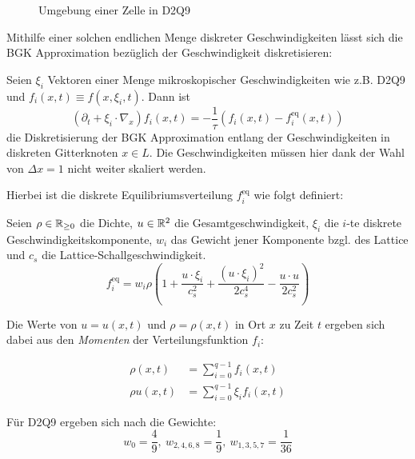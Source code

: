 \begin{figure}
\centering

\caption{Umgebung einer Zelle in D2Q9}
\end{figure}

Mithilfe einer solchen endlichen Menge diskreter Geschwindigkeiten lässt sich die BGK Approximation bezüglich der Geschwindigkeit diskretisieren:

\begin{Definition}
\label{def:disVelBGK}
Seien \(\xi_i\) Vektoren einer Menge mikroskopischer Geschwindigkeiten wie z.B. D2Q9 und \(f_i(x,t) \equiv f(x,\xi_i,t)\). Dann ist
\[ (\partial_t + \xi_i \cdot \nabla_x) f_i(x,t) = -\frac{1}{\tau} (f_i(x,t) - f_i^\text{eq}(x,t)) \]
die Diskretisierung der BGK Approximation entlang der Geschwindigkeiten in diskreten Gitterknoten \(x \in L\). Die Geschwindigkeiten müssen hier dank der Wahl von \(\Delta x = 1\) nicht weiter skaliert werden.
\end{Definition}

Hierbei ist die diskrete Equilibriumsverteilung \(f_i^\text{eq}\) wie folgt definiert:

\begin{Definition}
\label{def:fieq}
Seien \(\rho \in \mathbb{R}_{\geq 0}\) die Dichte, \(u \in \mathbb{R}^2\) die Gesamtgeschwindigkeit, \(\xi_i\) die \(i\)-te diskrete Geschwindigkeitskomponente, \(w_i\) das Gewicht jener Komponente bzgl. des Lattice und \(c_s\) die Lattice-Schallgeschwindigkeit.
\[f_i^\text{eq} = w_i \rho \left( 1 + \frac{u \cdot \xi_i}{c_s^2} + \frac{(u \cdot \xi_i)^2}{2c_s^4} - \frac{u \cdot u}{2c_s^2} \right)\]
\end{Definition}

Die Werte von \(u = u(x,t)\) und \(\rho = \rho(x,t)\) in Ort \(x\) zu Zeit \(t\) ergeben sich dabei aus den \emph{Momenten} der Verteilungsfunktion \(f_i\):

\begin{Definition}
\label{def:Momente}
\begin{align*}
\rho(x,t) &= \sum_{i=0}^{q-1} f_i(x,t) \\
\rho u(x,t) &= \sum_{i=0}^{q-1} \xi_i f_i(x,t)
\end{align*}
\end{Definition}

Für D2Q9 ergeben sich nach \cite[Gl.~3.60 bzw. Tab.~3.3]{krueger17} die Gewichte:
\[w_0 = \frac{4}{9}, \ w_{2,4,6,8} = \frac{1}{9}, \ w_{1,3,5,7} = \frac{1}{36}\]

